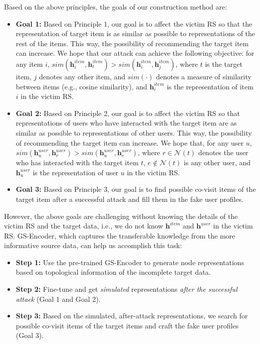 Based on the above principles, the goals of our construction method are:
\begin{itemize}
\item \textbf{Goal 1:} Based on Principle 1, our goal is to affect the victim RS so that the representation of target item is as similar as possible to representations of the rest of the items. This way, the possibility of recommending the target item can increase. We hope that our attack can achieve the following objective: for any item $i$, $sim(\mathbf{h}^{item}_i, \mathbf{h}^{item}_t)>sim(\mathbf{h}^{item}_i, \mathbf{h}^{item}_j)$, where $t$ is the target item, $j$ denotes any other item, and $sim(\cdot)$ denotes a measure of similarity between items (e.g., cosine similarity), and $\mathbf{h}^{item}_i$ is the representation of item $i$ in the victim RS.

\item \textbf{Goal 2:} Based on Principle 2, our goal is to affect the victim RS so that representations of users who have interacted with the target item are as similar as possible to representations of other users. This way, the possibility of recommending the target item can increase. We hope that, for any user $u$, $sim(\mathbf{h}^{user}_u, \mathbf{h}^{user}_r)>sim(\mathbf{h}^{user}_u, \mathbf{h}^{user}_e)$, where $r \in \mathcal{N}(t)$ denotes the user who has interacted with the target item $t$, $e \notin \mathcal{N}(t)$ is any other user, and $\mathbf{h}^{user}_u$ is the representation of user $u$ in the victim RS.

\item \textbf{Goal 3:} Based on Principle 3, our goal is to find possible co-visit items of the target item after a successful attack and fill them in the fake user profiles.
\end{itemize}

However, the above goals are challenging without knowing the details of the victim RS and the target data, i.e., we do not know $\mathbf{h}^{item}$ and $\mathbf{h}^{user}$ in the victim RS. 
GS-Encoder, which captures the transferable knowledge from the more informative source data, can help us accomplish this task:
\begin{itemize}
\item \textbf{Step 1:} Use the pre-trained GS-Encoder to generate node representations based on topological information of the incomplete target data. 

\item \textbf{Step 2:} Fine-tune and get \emph{simulated} representations \emph{after the successful attack} (Goal 1 and Goal 2). 

\item \textbf{Step 3:}  Based on the simulated, after-attack representations, we search for possible co-visit items of the target items and craft the fake user profiles (Goal 3).
\end{itemize}

